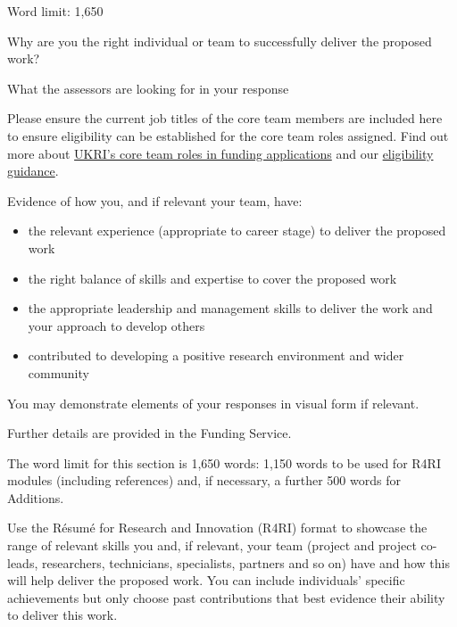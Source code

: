 \documentclass[12pt]{article}
\newenvironment{instruction}{\par\color{red}}{\par}
\begin{document}
\begin{instruction}
Word limit: 1,650

Why are you the right individual or team to successfully deliver the proposed
work?

What the assessors are looking for in your response

Please ensure the current job titles of the core team members are included
here to ensure eligibility can be established for the core team roles assigned.
Find out more about
\href{https://www.ukri.org/publications/roles-in-funding-applications/roles-in-funding-applications-eligibility-responsibilities-and-costings-guidance/}{UKRI’s
core team roles in funding applications} and our
\href{https://www.ukri.org/councils/bbsrc/guidance-for-applicants/check-if-youre-eligible-for-funding/applicants-and-co-applicants/}{eligibility
guidance}.

Evidence of how you, and if relevant your team, have:

\begin{itemize}

    \item the relevant experience (appropriate to career stage) to deliver the proposed
work

    \item the right balance of skills and expertise to cover the proposed work

    \item the appropriate leadership and management skills to deliver the work and
your approach to develop others

    \item contributed to developing a positive research environment and wider
community

\end{itemize}

You may demonstrate elements of your responses in visual form if relevant.

Further details are provided in the Funding Service.

The word limit for this section is 1,650 words: 1,150 words to be used for R4RI
modules (including references) and, if necessary, a further 500 words for
Additions.

Use the Résumé for Research and Innovation (R4RI) format to showcase the range
of relevant skills you and, if relevant, your team (project and project
co-leads, researchers, technicians, specialists, partners and so on) have and
how this will help deliver the proposed work. You can include individuals’
specific achievements but only choose past contributions that best evidence
their ability to deliver this work.


\end{instruction}
\end{document}

